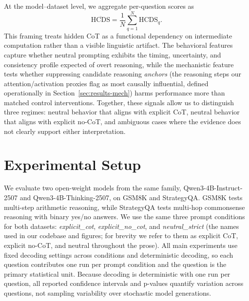 \documentclass{article}
\theoremstyle{plain}
\theoremstyle{definition}
\theoremstyle{remark}
\begin{document}
At the model--dataset level, we aggregate per-question scores as
\begin{equation}
\overline{\mathrm{HCDS}} = \frac{1}{N}\sum_{q=1}^{N} \mathrm{HCDS}_q.
\label{eq:hcds-mean}
\end{equation}
This framing treats hidden CoT as a functional dependency on intermediate computation rather than a visible linguistic artifact. The behavioral features capture whether neutral prompting exhibits the timing, uncertainty, and consistency profile expected of overt reasoning, while the mechanistic feature tests whether suppressing candidate reasoning \emph{anchors} (the reasoning steps our attention/activation proxies flag as most causally influential, defined operationally in Section~\ref{sec:results-mech}) harms performance more than matched control interventions. Together, these signals allow us to distinguish three regimes: neutral behavior that aligns with explicit CoT, neutral behavior that aligns with explicit no-CoT, and ambiguous cases where the evidence does not clearly support either interpretation.

\section{Experimental Setup}

We evaluate two open-weight models from the same family, Qwen3-4B-Instruct-2507 and Qwen3-4B-Thinking-2507, on GSM8K and StrategyQA. GSM8K tests multi-step arithmetic reasoning, while StrategyQA tests multi-hop commonsense reasoning with binary yes/no answers. We use the same three prompt conditions for both datasets: \textit{explicit\_cot}, \textit{explicit\_no\_cot}, and \textit{neutral\_strict} (the names used in our codebase and figures; for brevity we refer to them as explicit CoT, explicit no-CoT, and neutral throughout the prose). All main experiments use fixed decoding settings across conditions and deterministic decoding, so each question contributes one run per prompt condition and the question is the primary statistical unit. Because decoding is deterministic with one run per question, all reported confidence intervals and p-values quantify variation across questions, not sampling variability over stochastic model generations.
\end{document}
